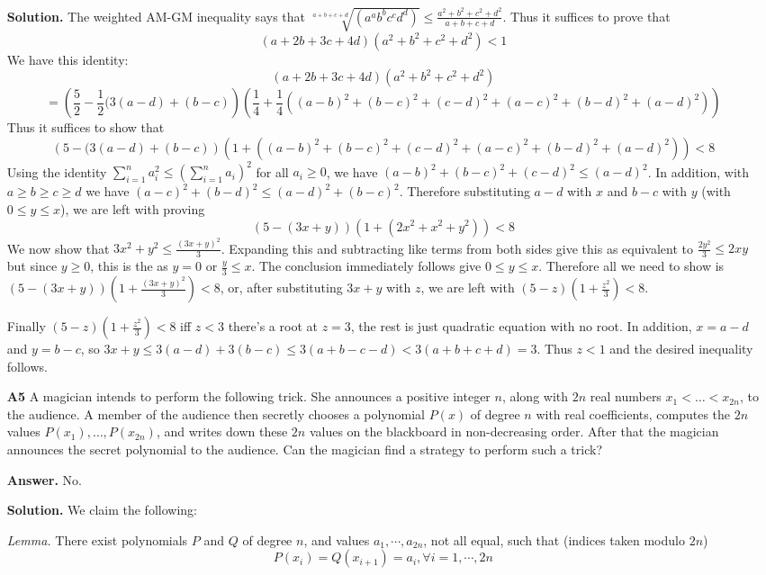 \documentclass[11pt,a4paper]{article}
\begin{document}
\begin{enumerate}
	\textbf{Solution.} The weighted AM-GM inequality says that $\sqrt[a+b+c+d]{(a^ab^bc^cd^d)}\le \frac{a^2+b^2+c^2+d^2}{a+b+c+d}$. Thus it suffices to prove that 
	\[(a+2b+3c+4d)(a^2+b^2+c^2+d^2)<1\]
	We have this identity: 
	\[
	(a+2b+3c+4d)(a^2+b^2+c^2+d^2)
	\]\[
	=
	\left(\frac{5}{2}-\frac{1}{2}(3(a-d)+(b-c)\right)\left(\frac{1}{4}+\frac{1}{4}((a-b)^2+(b-c)^2+(c-d)^2+(a-c)^2+(b-d)^2+(a-d)^2)\right)
	\]
	Thus it suffices to show that 
	$$
	\left(5-(3(a-d)+(b-c)\right)\left(1+((a-b)^2+(b-c)^2+(c-d)^2+(a-c)^2+(b-d)^2+(a-d)^2)\right)< 8
	$$
	Using the identity $\displaystyle\sum_{i=1}^n a_i^2\le (\displaystyle\sum_{i=1}^n a_i)^2$ for all $a_i\ge 0$, we have $(a-b)^2+(b-c)^2+(c-d)^2\le (a-d)^2$.
	In addition, with $a\ge b\ge c\ge d$ we have $(a-c)^2+(b-d)^2\le (a-d)^2+(b-c)^2$.
	Therefore substituting $a-d$ with $x$ and $b-c$ with $y$ (with $0\le y\le x$), we are left with proving
	$$
	\left(5-(3x+y)\right)\left(1+(2x^2+x^2+y^2)\right)< 8
	$$
	We now show that $3x^2+y^2\le \frac{(3x+y)^2}{3}$. Expanding this and subtracting like terms from both sides give this as equivalent to $\frac{2y^2}{3}\le 2xy$ but since $y\ge 0$, this is the as $y=0$ or $\frac{y}{3}\le x$. The conclusion immediately follows give $0\le y\le x$.
	Therefore all we need to show is
	$\left(5-(3x+y)\right)\left(1+\frac{(3x+y)^2}{3}\right)< 8$, or, after substituting $3x+y$ with $z$, we are left with
	$(5-z)(1+\frac{z^2}{3})<8$.
	
	Finally $(5-z)(1+\frac{z^2}{3})<8$ iff $z<3$ there's a root at $z=3$, the rest is just quadratic equation with no root. In addition, $x=a-d$ and $y=b-c$, so $3x+y\le 3(a-d)+3(b-c)\le 3(a+b-c-d)<3(a+b+c+d)=3$. Thus $z<1$ and the desired inequality follows.
	
	\item[\textbf{A5}]
	A magician intends to perform the following trick. She announces a positive integer $n$, along with $2n$ real numbers $x_1 < \dots < x_{2n}$, to the audience. A member of the audience then secretly chooses a polynomial $P(x)$ of degree $n$ with real coefficients, computes the $2n$ values $P(x_1), \dots , P(x_{2n})$, and writes down these $2n$ values on the blackboard in non-decreasing order. After that the magician announces the secret polynomial to the audience. Can the magician find a strategy to perform such a trick?
	
	\textbf{Answer.} No. 
	
	\textbf{Solution.} 
	We claim the following: 
	
	\emph{Lemma.} 
	There exist polynomials $P$ and $Q$ of degree $n$, and values $a_1, \cdots, a_{2n}$, not all equal, such that (indices taken modulo $2n$)
	\[
	P(x_i)=Q(x_{i+1})=a_i, \forall i=1,\cdots, 2n
	\]
	

\end{enumerate}
\end{document}
